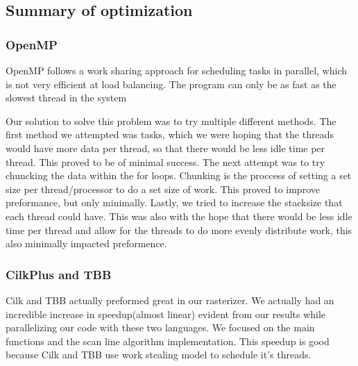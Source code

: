 \subsection*{Summary of optimization}

\subsubsection*{OpenMP}
OpenMP follows a work sharing approach for scheduling tasks in parallel, which is not very efficient at load balancing. The program can only be as fast as the slowest thread in the system

Our solution to solve this problem was to try multiple different methods. The first method we attempted was tasks, which we were hoping that the threads would have more data per thread, so that there would be less idle time per thread. This proved to be of minimal success. The next attempt was to try chuncking the data within the for loops. Chunking is the proccess of setting a set size per thread/processor to do a set size of work. This proved to improve preformance, but only minimally. Lastly, we tried to increase the stacksize that each thread could have. This was also with the hope that there would be less idle time per thread and allow for the threads to do more evenly distribute work, this also minimally impacted preformence. 

\subsubsection{CilkPlus and TBB}
Cilk and TBB actually preformed great in our rasterizer. We actually had an incredible increase in speedup(almost linear) evident from our results while parallelizing our code with these two languages. We focused on the main functions and the scan line algorithm implementation. This speedup is good because Cilk and TBB use work stealing model to schedule it's threads.
    
